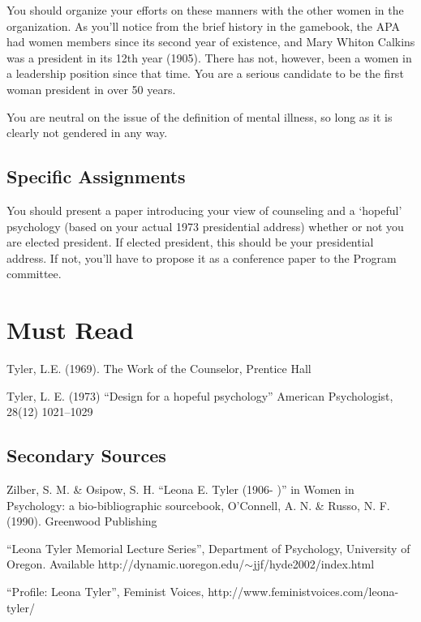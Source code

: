 You should organize your efforts on these manners with the other women in the organization. As you'll notice from the brief history in the gamebook, the APA had women members since its second year of existence, and Mary Whiton Calkins was a president in its 12th year (1905). There has not, however, been a women in a leadership position since that time. You are a serious candidate to be the first woman president in over 50 years.

You are neutral on the issue of the definition of mental illness, so long as it is clearly not gendered in any way.

\subsection{Specific Assignments}
\label{specificassignments}

You should present a paper introducing your view of counseling and a `hopeful' psychology (based on your actual 1973 presidential address) whether or not you are elected president. If elected president, this should be your presidential address. If not, you'll have to propose it as a conference paper to the Program committee.

\section{Must Read}
\label{mustread}

Tyler, L.E. (1969). The Work of the Counselor, Prentice Hall

Tyler, L. E. (1973) ``Design for a hopeful psychology'' American Psychologist, 28(12) 1021--1029

\subsection{Secondary Sources}
\label{secondarysources}

Zilber, S. M. \& Osipow, S. H. ``Leona E. Tyler (1906- )'' in Women in Psychology: a bio-bibliographic sourcebook, O'Connell, A. N. \& Russo, N. F. (1990). Greenwood Publishing

``Leona Tyler Memorial Lecture Series'', Department of Psychology, University of Oregon. Available http:\slash \slash dynamic.uoregon.edu\slash \ensuremath{\sim}jjf\slash hyde2002\slash index.html

``Profile: Leona Tyler'', Feminist Voices, http:\slash \slash www.feministvoices.com\slash leona-tyler\slash 


